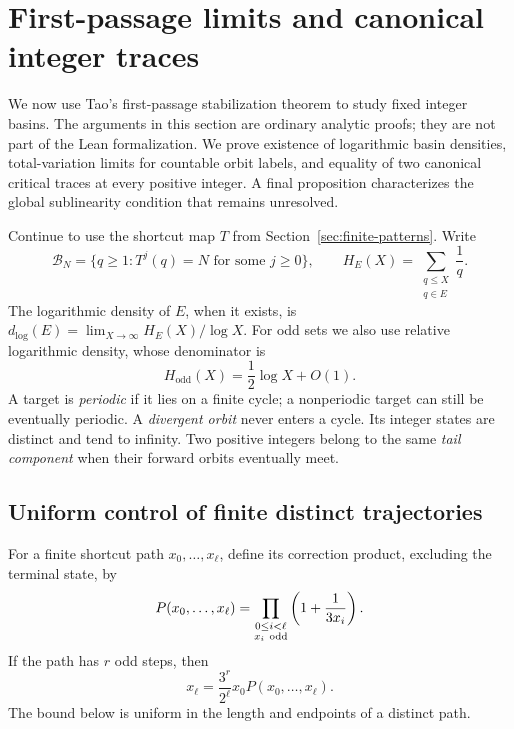 \section{First-passage limits and canonical integer traces}
\label{sec:canonical-traces}

We now use Tao's first-passage stabilization theorem to study fixed
integer basins. The arguments in this section are ordinary analytic
proofs; they are not part of the Lean formalization. We prove
existence of logarithmic basin densities, total-variation limits for
countable orbit labels, and equality of two canonical critical traces
at every positive integer. A final proposition characterizes the
global sublinearity condition that remains unresolved.

Continue to use the shortcut map \(T\) from
Section~\ref{sec:finite-patterns}. Write
\[
 \mathcal B_N=\{q\ge1:T^j(q)=N\text{ for some }j\ge0\},
 \qquad
 H_E(X)=\sum_{\substack{q\le X\\q\in E}}\frac1q.
\]
The logarithmic density of \(E\), when it exists, is
\(d_{\log}(E)=\lim_{X\to\infty}H_E(X)/\log X\).
For odd sets we also use relative logarithmic density, whose
denominator is
\[
 H_{\mathrm{odd}}(X)=\frac12\log X+O(1).
\]
A target is \emph{periodic} if it lies on a finite cycle; a
nonperiodic target can still be eventually periodic. A
\emph{divergent orbit} never enters a cycle. Its integer states
are distinct and tend to infinity.
Two positive integers belong to the same \emph{tail component}
when their forward orbits eventually meet.

\subsection{Uniform control of finite distinct trajectories}

For a finite shortcut path \(x_0,\ldots,x_\ell\), define its
correction product, excluding the terminal state, by
\[
 P(x_0,\ldots,x_\ell)
 =\prod_{\substack{0\le i<\ell\\x_i\ {\rm odd}}}
       \left(1+\frac1{3x_i}\right).
\]
If the path has \(r\) odd steps, then
\begin{equation}\label{eq:ct-product}
 x_\ell=\frac{3^r}{2^\ell}x_0P(x_0,\ldots,x_\ell).
\end{equation}
The bound below is uniform in the length and endpoints of a
distinct path.


